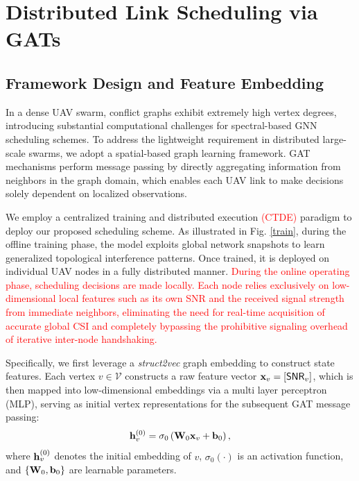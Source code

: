 \documentclass[journal]{IEEEtran}
\begin{document}
	
	\section{Distributed Link Scheduling via GATs}\label{s3}
	
	\subsection{Framework Design and Feature Embedding}\label{ss3A}
	In a dense UAV swarm, conflict graphs exhibit extremely high vertex degrees, introducing substantial computational challenges for spectral-based GNN scheduling schemes. To address the lightweight requirement in distributed large-scale swarms, we adopt a spatial-based graph learning framework. GAT mechanisms perform message passing by directly aggregating information from neighbors in the graph domain, which enables each UAV link to make decisions solely dependent on localized observations.
	
	We employ a centralized training and distributed execution \textcolor{red}{(CTDE)} paradigm to deploy our proposed scheduling scheme. As illustrated in Fig. \ref{train}, during the offline training phase, the model exploits global network snapshots to learn generalized topological interference patterns. Once trained, it is deployed on individual UAV nodes in a fully distributed manner. \textcolor{red}{During the online operating phase, scheduling decisions are made locally. Each node relies exclusively on low-dimensional local features such as its own SNR and the received signal strength from immediate neighbors, eliminating the need for real-time acquisition of accurate global CSI and completely bypassing the prohibitive signaling overhead of iterative inter-node handshaking.}
	
	Specifically, we first leverage a \textit{struct2vec} graph embedding \cite{graphEmbedding} to construct state features. Each vertex $v\in \mathcal{V}$ constructs a raw feature vector ${\bf x}_v = \left[\mathsf{SNR}_v\right]$, which is then mapped into low-dimensional embeddings via a multi layer perceptron (MLP), serving as initial vertex representations for the subsequent GAT message passing:
	\begin{equation}
		{\bf h}_v^{(0)} = \sigma_0\left({\bf W}_0{\bf x}_v+{\bf b}_0\right),
	\end{equation}
	where ${\bf h}_v^{(0)}$ denotes the initial embedding of $v$, $\sigma_0(\cdot)$ is an activation function, and $\{{\bf W}_0, {\bf b}_0\}$ are learnable parameters.
	
\end{document}
